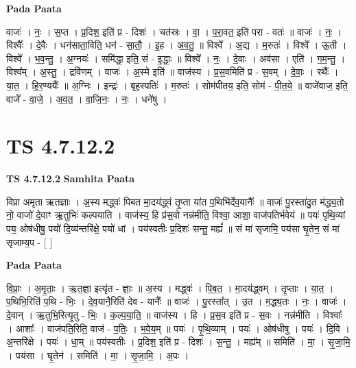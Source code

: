\documentclass[17pt]{extarticle}
\begin{document}
\textbf{Pada Paata} \newline

वाजः॑ । नः॒ । स॒प्त । प्र॒दिश॒ इति॑ प्र - दिशः॑ । चत॑स्रः । वा॒ । प॒रा॒वत॒ इति॑ परा - वतः॑ ॥ वाजः॑ । नः॒ । विश्वैः᳚ । दे॒वैः । धन॑साता॒विति॒ धन॑ - सा॒तौ॒ । इ॒ह । अ॒व॒तु॒ ॥ विश्वे᳚ । अ॒द्य । म॒रुतः॑ । विश्वे᳚ । ऊ॒ती । विश्वे᳚ । भ॒व॒न्तु॒ । अ॒ग्नयः॑ । समि॑द्धा॒ इति॒ सं - इ॒द्धाः॒ ॥ विश्वे᳚ । नः॒ । दे॒वाः । अव॑सा । एति॑ । ग॒म॒न्तु॒ । विश्व᳚म् । अ॒स्तु॒ । द्रवि॑णम् । वाजः॑ । अ॒स्मे इति॑ ॥ वाज॑स्य । प्र॒स॒वमिति॑ प्र - स॒वम् । दे॒वाः॒ । रथैः᳚ । या॒त॒ । हि॒र॒ण्ययैः᳚ ॥ अ॒ग्निः । इन्द्रः॑ । बृह॒स्पतिः॑ । म॒रुतः॑ । सोम॑पीतय॒ इति॒ सोम॑ - पी॒त॒ये॒ ॥ वाजे॑वाज॒ इति॒ वाजे᳚ - वा॒जे॒ । अ॒व॒त॒ । वा॒जि॒नः॒ । नः॒ । धने॑षु ।  \newline




\section*{ TS 4.7.12.2 }

\textbf{TS 4.7.12.2 } \newline
\textbf{Samhita Paata} \newline

विप्रा अमृता ऋतज्ञाः । अ॒स्य मद्ध्वः॑ पिबत मा॒दय॑द्ध्वं तृ॒प्ता या॑त प॒थिभि॑र्देव॒यानैः᳚ ॥ वाजः॑ पु॒रस्ता॑दु॒त म॑द्ध्य॒तो नो॒ वाजो॑ दे॒वाꣳ ऋ॒तुभिः॑ कल्पयाति । वाज॑स्य॒ हि प्र॑स॒वो नन्न॑मीति॒ विश्वा॒ आशा॒ वाज॑पतिर्भवेयं ॥ पयः॑ पृथि॒व्यां पय॒ ओष॑धीषु॒ पयो॑ दि॒व्य॑न्तरि॑क्षे॒ पयो॑ धां । पय॑स्वतीः प्र॒दिशः॑ सन्तु॒ मह्यं᳚ ॥ सं मा॑ सृजामि॒ पय॑सा घृ॒तेन॒ सं मा॑ सृजाम्य॒प - [  ] \newline

\textbf{Pada Paata} \newline

वि॒प्राः॒ । अ॒मृ॒ताः॒ । ऋ॒त॒ज्ञा॒ इत्यृ॑त - ज्ञाः॒ ॥ अ॒स्य । मद्ध्वः॑ । पि॒ब॒त॒ । मा॒दय॑द्ध्वम् । तृ॒प्ताः । या॒त॒ । प॒थिभि॒रिति॑ प॒थि - भिः॒ । दे॒व॒यानै॒रिति॑ देव - यानैः᳚ ॥ वाजः॑ । पु॒रस्ता᳚त् । उ॒त । म॒द्ध्य॒तः । नः॒ । वाजः॑ । दे॒वान् । ऋ॒तुभि॒रित्यृ॒तु - भिः॒ । क॒ल्प॒या॒ति॒ ॥ वाज॑स्य । हि । प्र॒स॒व इति॑ प्र - स॒वः । नन्न॑मीति । विश्वाः᳚ । आशाः᳚ । वाज॑पति॒रिति॒ वाज॑ - प॒तिः॒ । भ॒वे॒य॒म् ॥ पयः॑ । पृ॒थि॒व्याम् । पयः॑ । ओष॑धीषु । पयः॑ । दि॒वि । अ॒न्तरि॑क्षे । पयः॑ । धा॒म् ॥ पय॑स्वतीः । प्र॒दिश॒ इति॑ प्र - दिशः॑ । स॒न्तु॒ । मह्य᳚म् ॥ समिति॑ । मा॒ । सृ॒जा॒मि॒ । पय॑सा । घृ॒तेन॑ । समिति॑ । मा॒ । सृ॒जा॒मि॒ । अ॒पः ।  \newline
\end{document}
